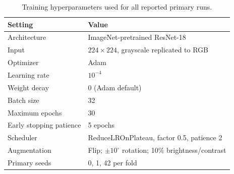 ﻿\documentclass[11pt]{article}
\begin{document}
\begin{table}[H]
\centering
\caption{Training hyperparameters used for all reported primary runs.}
\label{tab:s_hyperparameters}
\begin{tabular}{ll}
\toprule
Setting & Value \\
\midrule
Architecture & ImageNet-pretrained ResNet-18 \\
Input & $224\times224$, grayscale replicated to RGB \\
Optimizer & Adam \\
Learning rate & $10^{-4}$ \\
Weight decay & 0 (Adam default) \\
Batch size & 32 \\
Maximum epochs & 30 \\
Early stopping patience & 5 epochs \\
Scheduler & ReduceLROnPlateau, factor 0.5, patience 2 \\
Augmentation & Flip; $\pm10^\circ$ rotation; 10\% brightness/contrast \\
Primary seeds & 0, 1, 42 per fold \\
\bottomrule
\end{tabular}
\end{table}
\end{document}
